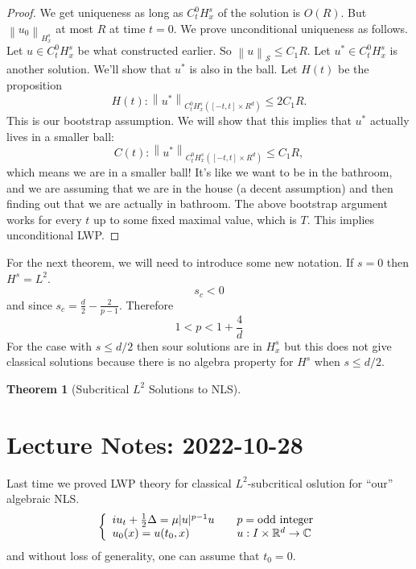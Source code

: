 \documentclass{article}
\newtheorem{theorem}{Theorem}
\def\R{\mathbb{R}} %
\newcommand\norm[1]{\left\lVert#1\right\rVert}
\begin{document}
\begin{proof}
  We get uniqueness as long as $C_{t}^{0}H_{x}^{s}$ of the solution is $O(R)$.
  But $\norm{u_0}_{H_{x}^{s}}$ at most $R$ at time $t=0$. We prove unconditional
  uniqueness as follows. Let $u\in C_{t}^{0}H^{s}_{x}$ be what constructed
  earlier. So $\norm{u}_{\mathcal{S}}\leq C_{1}R$. Let $u^{*}\in
  C_{t}^{0}H^{s}_{x}$ is another solution. We'll show that $u^{*}$ is also in
  the ball. Let $H(t)$ be the proposition
  \begin{equation*}
    H(t):
    \norm{u^{*}}_{C_{t}^{0}H_{x}^{s}\left( [-t,t]\times R^{d} \right) } 
    \leq 2C_{1}R.
  \end{equation*}
  This is our bootstrap assumption. We will show that this implies that $u^{*}$
  actually lives in a smaller ball:
  \begin{equation*}
    C(t):
    \norm{u^{*}}_{C_{t}^{0}H_{x}^{s}\left( [-t,t]\times R^{d} \right) } 
    \leq C_{1}R,
  \end{equation*}
  which means we are in a smaller ball! It's like we want to be in the bathroom,
  and we are assuming that we are in the house (a decent assumption) and then
  finding out that we are actually in bathroom. The above bootstrap argument
  works for every $t$ up to some fixed maximal value, which is $T$. This implies
  unconditional LWP.   
\end{proof}
For the next theorem, we will need to introduce some new notation. If $s=0$ then $H^{s}=L^{2}$. 
\begin{equation*}
  s_{c}<0
\end{equation*}
and since $s_{c}=\frac{d}{2}-\frac{2}{p-1}$. Therefore
\begin{equation*}
  1<p <1+\frac{4}{d}
\end{equation*}
For the case with $s \leq d/2$ then sour solutions are in $H_{x}^{s}$ but this
does not give classical solutions because there is no algebra property for
$H^{s}$ when $s \leq d/2$.

\begin{theorem}[Subcritical $L^2$ Solutions to NLS]
  \label{thm:subcritical-L2-solutions-nls}  
\end{theorem}
\section{Lecture Notes:  2022-10-28}
Last time we proved LWP theory for classical $L^{2}$-subcritical oslution for
``our'' algebraic NLS.
\begin{equation}\label{eq:NLS-2022-10-28}
  \left\{
    \begin{array}{l@{\quad\quad}l} iu_{t}+\frac{1}{2}\Delta = \mu|u|^{p-1}u &
      p=\text{odd integer}\\
      u_{0}(x)= u(t_{0},x)& u:I\times \R^d \to \mathbb{C}
    \end{array}
  \right.
\end{equation}
and without loss of generality, one can assume that $t_{0}=0$.
\end{document}
